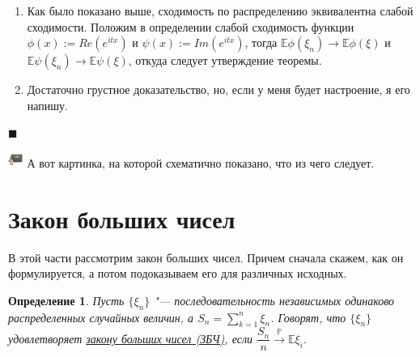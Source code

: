 \documentclass[12pt]{article}
\newtheorem{Def}{Определение}
\newenvironment{Proof}{\par\noindent{\bf Доказательство}}{$\blacksquare$}
\newenvironment{Wtf}{\includegraphics[height=5mm]{ping}}{}
\numberwithin{Th}{section}
\numberwithin{Def}{section}
\numberwithin{Lem}{section}
\numberwithin{St}{section}
\numberwithin{equation}{section}
\newcommand\Pro{\mathbb{P}} %
\newcommand\Expec{\mathbb{E}} %
\newcommand\xequiv[1]{\stackrel{\mathrm{ #1}}{\equiv}}
\begin{document}
\begin{Proof}
\begin{enumerate}
	\item Как было показано выше, сходимость по распределению эквивалентна слабой сходимости. Положим в определении слабой сходимость функции $\phi(x) := Re(e^{itx})$ и $\psi(x) := Im(e^{itx})$, тогда $\Expec\phi(\xi_n) \rightarrow \Expec\phi(\xi)$ и $\Expec\psi(\xi_n) \rightarrow \Expec\psi(\xi)$, откуда следует утверждение теоремы.
	\item Достаточно грустное доказательство, но, если у меня будет настроение, я его напишу. 
\end{enumerate}
\end{Proof}

\begin{Wtf}
А вот картинка, на которой схематично показано, что из чего следует.
\end{Wtf}

\begin{center}
\end{center}

\newpage

\section{Закон больших чисел}
В этой части рассмотрим закон больших чисел. Причем сначала скажем, как он формулируется, а потом подоказываем его для различных исходных.

\begin{Def}
    Пусть $\{\xi_n\}$ "--- последовательность независимых одинаково распределенных случайных величин, а $S_n = \sum\limits_{k=1}^{n} \xi_n$.
    Говорят, что $\{\xi_n\}$ удовлетворяет \uline{закону больших чисел (ЗБЧ)}, если $\dfrac{S_n}{n} \xrightarrow[]{\Pro} \Expec \xi_i.$ 
\end{Def} 
\end{document}
